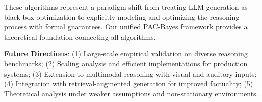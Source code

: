 \documentclass[11pt,a4paper]{article}
\begin{document}
These algorithms represent a paradigm shift from treating LLM generation as black-box optimization to explicitly modeling and optimizing the reasoning process with formal guarantees. Our unified PAC-Bayes framework provides a theoretical foundation connecting all algorithms.

\textbf{Future Directions}: (1) Large-scale empirical validation on diverse reasoning benchmarks; (2) Scaling analysis and efficient implementations for production systems; (3) Extension to multimodal reasoning with visual and auditory inputs; (4) Integration with retrieval-augmented generation for improved factuality; (5) Theoretical analysis under weaker assumptions and non-stationary environments.

\end{document}
